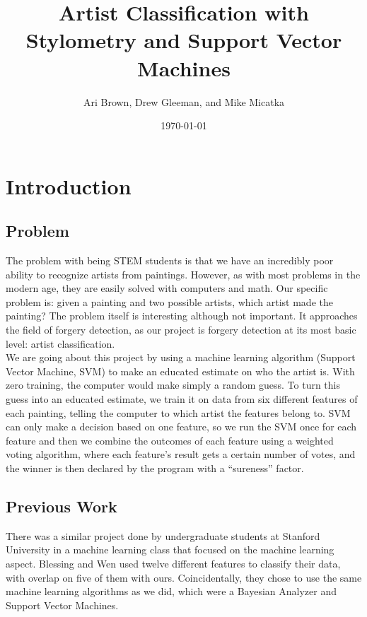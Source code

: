 \documentclass[twocolumn]{article}
\title{Artist Classification with Stylometry and Support Vector Machines}
\author{Ari Brown, Drew Gleeman, and Mike Micatka}
\date{\today}
\begin{document}
  \maketitle

  \section{Introduction}
  \subsection{Problem}
  The problem with being STEM students is that we have an incredibly poor ability
  to recognize artists from paintings. However, as with most problems in the
  modern age, they are easily solved with computers and math. Our specific problem
  is: given a painting and two possible artists, which artist made the painting?
  The problem itself is interesting although not important. It approaches the
  field of forgery detection, as our project is forgery detection at its most
  basic level: artist classification. \\
  
  We are going about this project by using a machine learning algorithm (Support
  Vector Machine, SVM) to make an educated estimate on who the artist is. With
  zero training, the computer would make simply a random guess. To turn this guess
  into an educated estimate, we train it on data from six different features of
  each painting, telling the computer to which artist the features belong to.
  SVM can only make a decision based on one feature, so we run the SVM once for
  each feature and then we combine the outcomes of each feature using a weighted
  voting algorithm, where each feature's result gets a certain number of votes,
  and the winner is then declared by the program with a ``sureness'' factor.

  \subsection{Previous Work}
  There was a similar project done by undergraduate students at Stanford
  University in a machine learning class that focused on the machine learning
  aspect. Blessing and Wen used twelve different features to classify their
  data, with overlap on five of them with ours. Coincidentally, they chose to
  use the same machine learning algorithms as we did, which were a Bayesian
  Analyzer and Support Vector Machines. \\
  
\end{document}

